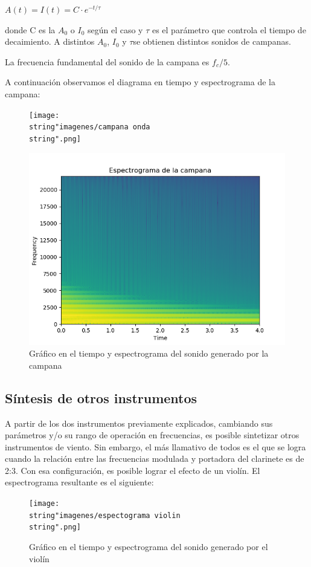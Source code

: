 \documentclass[../ASSD_TP2.tex]{subfiles}
\begin{document}
$A(t)=I(t)=C\cdot e^{-t/\tau}$ 

donde C es la $A_{0}$ o $I_{0}$ según el caso y $\tau$ es el parámetro
que controla el tiempo de decaimiento. A distintos $A_{0}$, $I_{0}$
y $\tau$se obtienen distintos sonidos de campanas.

La frecuencia fundamental del sonido de la campana es $f_{c}/5$.

A continuación observamos el diagrama en tiempo y espectrograma de
la campana:

\begin{figure}[H]
\begin{centering}
\texttt{[image: \\string"imagenes/campana onda\\string".png]}
\par\end{centering}
\centering{}\includegraphics[scale=0.75]{imagenes/Figure_1}\caption{Gráfico en el tiempo y espectrograma del sonido generado por la campana}
\end{figure}


\subsection{Síntesis de otros instrumentos}

A partir de los dos instrumentos previamente explicados, cambiando
sus parámetros y/o su rango de operación en frecuencias, es posible
sintetizar otros instrumentos de viento. Sin embargo, el más llamativo
de todos es el que se logra cuando la relación entre las frecuencias
modulada y portadora del clarinete es de 2:3. Con esa configuración,
es posible lograr el efecto de un violín. El espectrograma resultante
es el siguiente:

\begin{figure}[H]

\begin{centering}
\texttt{[image: \\string"imagenes/espectograma violin\\string".png]}\caption{Gráfico en el tiempo y espectrograma del sonido generado por el violín}
\par\end{centering}
\end{figure}
\end{document}
